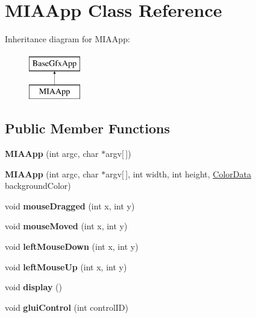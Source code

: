 \hypertarget{classMIAApp}{}\section{M\+I\+A\+App Class Reference}
\label{classMIAApp}
Inheritance diagram for M\+I\+A\+App\+:\begin{figure}[H]
\begin{center}
\leavevmode
\includegraphics[height=2.000000cm]{classMIAApp}
\end{center}
\end{figure}
\subsection*{Public Member Functions}
\begin{DoxyCompactItemize}
\item 
{\bfseries M\+I\+A\+App} (int argc, char $\ast$argv\mbox{[}$\,$\mbox{]})\hypertarget{classMIAApp_a99c82819221bee486f5eb1628df3dc58}{}\label{classMIAApp_a99c82819221bee486f5eb1628df3dc58}

\item 
{\bfseries M\+I\+A\+App} (int argc, char $\ast$argv\mbox{[}$\,$\mbox{]}, int width, int height, \hyperlink{classColorData}{Color\+Data} background\+Color)\hypertarget{classMIAApp_a0dbcbcd31a2ba7fd55988354e9cc0d93}{}\label{classMIAApp_a0dbcbcd31a2ba7fd55988354e9cc0d93}

\item 
void {\bfseries mouse\+Dragged} (int x, int y)\hypertarget{classMIAApp_a92f074cdaf7660abf7da902ad78f7ceb}{}\label{classMIAApp_a92f074cdaf7660abf7da902ad78f7ceb}

\item 
void {\bfseries mouse\+Moved} (int x, int y)\hypertarget{classMIAApp_a89342bccfdad6cd476677f19edf7c9bd}{}\label{classMIAApp_a89342bccfdad6cd476677f19edf7c9bd}

\item 
void {\bfseries left\+Mouse\+Down} (int x, int y)\hypertarget{classMIAApp_a8174b71f6537aea41c1cda099e47a0d0}{}\label{classMIAApp_a8174b71f6537aea41c1cda099e47a0d0}

\item 
void {\bfseries left\+Mouse\+Up} (int x, int y)\hypertarget{classMIAApp_a804a0a6a7e3f165adea88bb416232803}{}\label{classMIAApp_a804a0a6a7e3f165adea88bb416232803}

\item 
void {\bfseries display} ()\hypertarget{classMIAApp_a5b88636a4d17872ab922a4b088696608}{}\label{classMIAApp_a5b88636a4d17872ab922a4b088696608}

\item 
void {\bfseries glui\+Control} (int control\+ID)\hypertarget{classMIAApp_affee3adfef9a7491607d93554a2bb9c0}{}\label{classMIAApp_affee3adfef9a7491607d93554a2bb9c0}

\end{DoxyCompactItemize}
